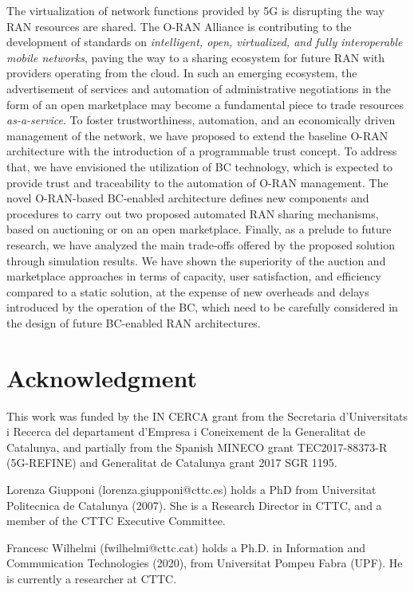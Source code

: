 \documentclass[journal]{IEEEtran}
\begin{document}
The virtualization of network functions provided by 5G is disrupting the way RAN resources are shared. The O-RAN Alliance is contributing to the development of standards on \textit{intelligent, open, virtualized, and fully interoperable mobile networks}, paving the way to a sharing ecosystem for future RAN with providers operating from the cloud. In such an emerging ecosystem, the advertisement of services and automation of administrative negotiations in the form of an open marketplace may become a fundamental piece to trade resources \textit{as-a-service}. To foster trustworthiness, automation, and an economically driven management of the network, we have proposed to extend the baseline O-RAN architecture with the introduction of a programmable trust concept. To address that, we have envisioned the utilization of BC technology, which is expected to provide trust and traceability to the automation of O-RAN management. The novel O-RAN-based BC-enabled architecture defines new components and procedures to carry out two proposed automated RAN sharing mechanisms, based on auctioning or on an open marketplace. Finally, as a prelude to future research, we have analyzed the main trade-offs offered by the proposed solution through simulation results. We have shown the superiority of the auction and marketplace approaches in terms of capacity, user satisfaction, and efficiency compared to a static solution, at the expense of new overheads and delays introduced by the operation of the BC, which need to be carefully considered in the design of future BC-enabled RAN architectures.

\section*{Acknowledgment}
This work was funded by the IN CERCA grant from the Secretaria d'Universitats i Recerca del departament d'Empresa i Coneixement de la Generalitat de Catalunya, and partially from the Spanish MINECO grant TEC2017-88373-R (5G-REFINE) and Generalitat de Catalunya grant 2017 SGR 1195.
	
\ifCLASSOPTIONcaptionsoff
\newpage
\fi
	



\begin{IEEEbiographynophoto}{Lorenza Giupponi}
(lorenza.giupponi@cttc.es) holds  a  PhD  from  Universitat  Politecnica  de  Catalunya
(2007). She is a Research Director in CTTC, and a member of the CTTC Executive Committee.
\end{IEEEbiographynophoto}
%
\begin{IEEEbiographynophoto}{Francesc Wilhelmi}
(fwilhelmi@cttc.cat) holds a Ph.D. in Information and Communication Technologies (2020), from Universitat Pompeu Fabra (UPF). He is currently a researcher at CTTC. 
\end{IEEEbiographynophoto}
\end{document}
